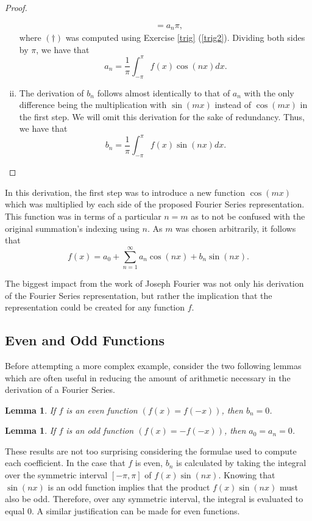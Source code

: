 \documentclass[11pt]{amsart}
\theoremstyle{plain}
\newtheorem{lemma}[theorem]{Lemma}
\theoremstyle{definition}
\begin{document}
\begin{proof}
\begin{enumerate}[(i)]
\begin{align*}
        &= a_n\pi,
    \end{align*}
    where $(\dagger)$ was computed using Exercise \ref{trig} (\ref{trig2}). Dividing both sides by $\pi$, we have that 
    \begin{equation}
        \label{an}
        a_n =\dfrac{1}{\pi}\int_{-\pi}^{\pi}f(x)\cos(nx)dx.
    \end{equation}
    \label{fourier2}
    \item The derivation of $b_n$ follows almost identically to that of $a_n$ with the only difference being the multiplication with $\sin(mx)$ instead of $\cos(mx)$ in the first step. We will omit this derivation for the sake of redundancy. Thus, we have that 
    \begin{equation}
        \label{bn}
        b_n =\dfrac{1}{\pi}\int_{-\pi}^{\pi}f(x)\sin(nx)dx.
    \end{equation}
    \label{fourier3}
    \end{enumerate}
    \vspace{-1cm}
\end{proof}

In this derivation, the first step was to introduce a new function $\cos(mx)$ which was multiplied by each side of the proposed Fourier Series representation. This function was in terms of a particular $n = m$ as to not be confused with the original summation's indexing using $n$. As $m$ was chosen arbitrarily, it follows that 
$$f(x) = a_0 + \sum_{n=1}^\infty a_n\cos(nx) + b_n\sin(nx).$$

The biggest impact from the work of Joseph Fourier was not only his derivation of the Fourier Series representation, but rather the implication that the representation could be created for any function $f$. 

\subsection{Even and Odd Functions}
Before attempting a more complex example, consider the two following lemmas which are often useful in reducing the amount of arithmetic necessary in the derivation of a Fourier Series.
\begin{lemma}\label{even}
    If $f$ is an even function $(f(x) = f(-x))$, then $b_n = 0$.
\end{lemma}
\begin{lemma}\label{odd}
    If $f$ is an odd function $(f(x) = -f(-x))$, then $a_0 = a_n = 0$.
\end{lemma}
These results are not too surprising considering the formulae used to compute each coefficient. In the case that $f$ is even, $b_n$ is calculated by taking the integral over the symmetric interval $[-\pi,\pi]$ of $f(x)\sin(nx)$. Knowing that $\sin(nx)$ is an odd function implies that the product $f(x)\sin(nx)$ must also be odd. Therefore, over any symmetric interval, the integral is evaluated to equal 0. A similar justification can be made for even functions.
    
\end{document}
